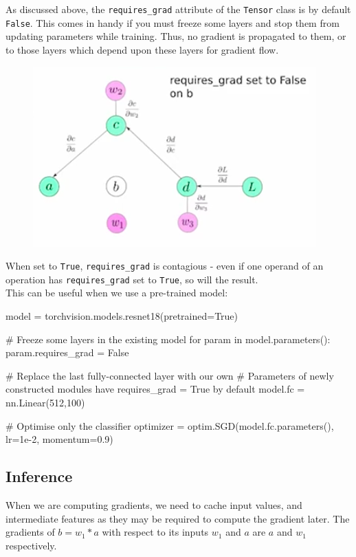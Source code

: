 As discussed above, the \texttt{requires\_grad} attribute of the \texttt{Tensor} class is by default \texttt{False}. This comes in handy if you must freeze some layers and stop them from updating parameters while training. Thus, no gradient is propagated to them, or to those layers which depend upon these layers for gradient flow.
\begin{figure}[H]
\centering
\includegraphics[scale=0.4]{requiresgrad.png}
\end{figure}
When set to \texttt{True}, \texttt{requires\_grad} is contagious - even if one operand of an operation has \texttt{requires\_grad} set to \texttt{True}, so will the result.\\

This can be useful when we use a pre-trained model:
\begin{python}
model = torchvision.models.resnet18(pretrained=True)

# Freeze some layers in the existing model
for param in model.parameters():
	param.requires_grad = False
	
# Replace the last fully-connected layer with our own
# Parameters of newly constructed modules have requires_grad = True by default
model.fc = nn.Linear(512,100)

# Optimise only the classifier
optimizer = optim.SGD(model.fc.parameters(), lr=1e-2, momentum=0.9)
\end{python}



\newpage
\subsection{Inference}
When we are computing gradients, we need to cache input values, and intermediate features as they may be required to compute the gradient later. The gradients of $b = w_1 * a$ with respect to its inputs $w_1$ and $a$ are $a$ and $w_1$ respectively.\\

